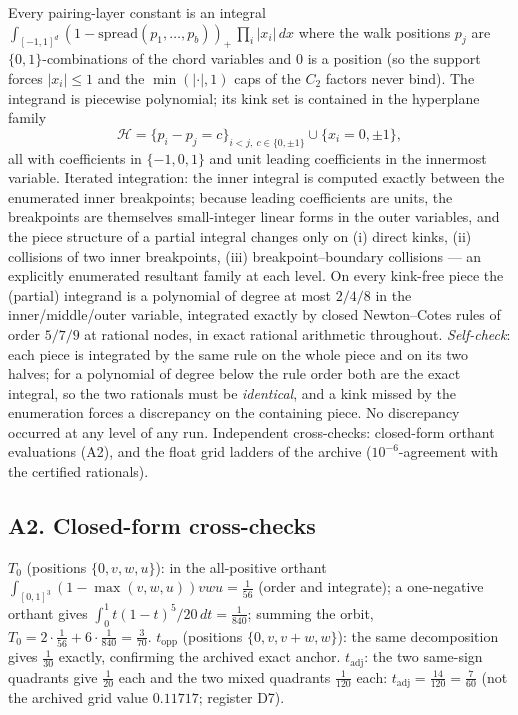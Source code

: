 \documentclass[11pt]{article}
\numberwithin{equation}{section}
\theoremstyle{definition}
\theoremstyle{remark}
\begin{document}
Every pairing-layer constant is an integral
$\int_{[-1,1]^{d}}(1-\mathrm{spread}(p_1,\dots,p_b))_+\,
\prod_i|x_i|\,dx$ where the walk positions $p_j$ are
$\{0,1\}$-combinations of the chord variables and $0$ is a
position (so the support forces $|x_i|\le1$ and the
$\min(|\cdot|,1)$ caps of the $C_2$ factors never bind). The
integrand is piecewise polynomial; its kink set is contained in
the hyperplane family
\[
\mathcal H=\bigl\{p_i-p_j=c\bigr\}_{i<j,\ c\in\{0,\pm1\}}
\cup\bigl\{x_i=0,\pm1\bigr\},
\]
all with coefficients in $\{-1,0,1\}$ and unit leading
coefficients in the innermost variable. Iterated integration:
the inner integral is computed exactly between the enumerated
inner breakpoints; because leading coefficients are units, the
breakpoints are themselves small-integer linear forms in the
outer variables, and the piece structure of a partial integral
changes only on (i) direct kinks, (ii) collisions of two inner
breakpoints, (iii) breakpoint--boundary collisions --- an
explicitly enumerated resultant family at each level. On every
kink-free piece the (partial) integrand is a polynomial of
degree at most $2/4/8$ in the inner/middle/outer variable,
integrated exactly by closed Newton--Cotes rules of order
$5/7/9$ at rational nodes, in exact rational arithmetic
throughout. \emph{Self-check}: each piece is integrated by the
same rule on the whole piece and on its two halves; for a
polynomial of degree below the rule order both are the exact
integral, so the two rationals must be \emph{identical}, and a
kink missed by the enumeration forces a discrepancy on the
containing piece. No discrepancy occurred at any level of any
run. Independent cross-checks: closed-form orthant evaluations
(A2), and the float grid ladders of the archive
($10^{-6}$-agreement with the certified rationals).

\subsection*{A2. Closed-form cross-checks}

$T_0$ (positions $\{0,v,w,u\}$): in the all-positive orthant
$\int_{[0,1]^3}(1-\max(v,w,u))vwu=\tfrac1{56}$ (order and
integrate); a one-negative orthant gives
$\int_0^1t(1-t)^5/20\,dt=\tfrac1{840}$; summing the orbit,
$T_0=2\cdot\tfrac1{56}+6\cdot\tfrac1{840}=\tfrac3{70}$.
$t_{\mathrm{opp}}$ (positions $\{0,v,v{+}w,w\}$): the same
decomposition gives $\tfrac1{30}$ exactly, confirming the
archived exact anchor. $t_{\mathrm{adj}}$: the two same-sign
quadrants give $\tfrac1{20}$ each and the two mixed quadrants
$\tfrac1{120}$ each: $t_{\mathrm{adj}}=\tfrac{14}{120}
=\tfrac7{60}$ (not the archived grid value $0.11717$; register
D7).
\end{document}
